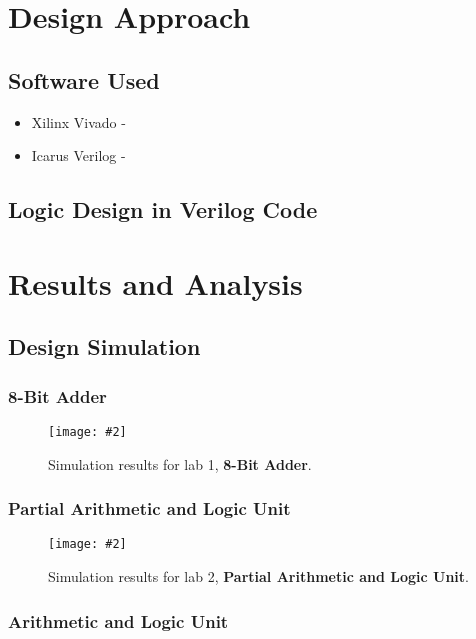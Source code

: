 \documentclass[12pt, letterpaper]{article}
\newcommand{\InsertImage}[3][\linewidth]{
	\begin{figure}[h]
		\centering
		\texttt{[image: \#2]}
		\caption{#3}
	\end{figure}
}
\newcommand{\InsertImageHere}[3][\linewidth]{
	\FloatBarrier
	\InsertImage[#1]{#2}{#3}
	\FloatBarrier
}
\begin{document}
\newpage
\section{Design Approach}

\subsection{Software Used}
\begin{itemize}
	\item Xilinx Vivado - 
	\item Icarus Verilog - 
\end{itemize}

\subsection{Logic Design in Verilog Code}


\newpage
\section{Results and Analysis}




\subsection{Design Simulation}


\subsubsection{8-Bit Adder}

\InsertImageHere{images/simulations/lab1/simulation.png}{Simulation results for lab 1, \textbf{8-Bit Adder}.}

\subsubsection{Partial Arithmetic and Logic Unit}

\InsertImageHere{images/simulations/lab2/simulation.png}{Simulation results for lab 2, \textbf{Partial Arithmetic and Logic Unit}.}

\subsubsection{Arithmetic and Logic Unit}
\end{document}
